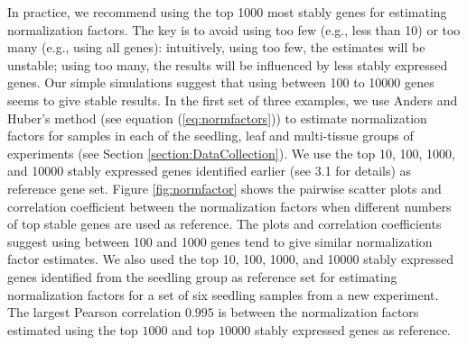 \documentclass[11pt, a4paper]{article}
\begin{document}
In practice, we recommend using the top 1000 most stably genes for estimating
normalization factors. The key is to avoid using too few (e.g., less than 10)
or too many (e.g., using all genes): intuitively, using too few, the estimates
will be unstable;
using too many, the results will be influenced by less stably
expressed genes.  Our simple simulations suggest that using between 100 to
10000 genes seems to give stable results.  In the first set of three
examples, we use Anders and Huber's method (see equation
(\ref{eq:normfactors})) to estimate normalization factors for samples in each
of the seedling, leaf and multi-tissue groups of experiments (see Section \ref{section:DataCollection}).  We
use the top 10, 100, 1000, and 10000 stably expressed genes identified earlier
(see 3.1 for details) as reference gene set. Figure \ref{fig:normfactor} shows
the pairwise scatter plots and correlation coefficient between the
normalization factors when different numbers of top stable genes are used as
reference. The plots and correlation coefficients suggest using between 100
and 1000 genes tend to give similar normalization factor estimates. We also
used the top 10, 100, 1000, and 10000 stably expressed genes identified from
the seedling group as reference set for estimating normalization factors for a
set of six seedling samples from a new experiment. The largest Pearson
correlation $0.995$ is between the normalization factors estimated using the
top $1000$ and top $10000$ stably expressed genes as reference.

\end{document}
